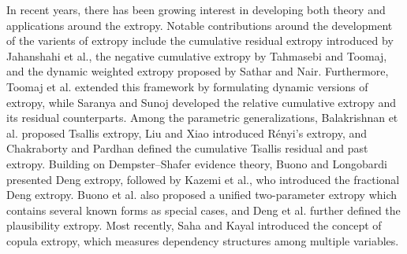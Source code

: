 \documentclass[pdflatex]{sn-jnl}%
\theoremstyle{thmstyleone}
\theoremstyle{thmstyletwo}%
\theoremstyle{thmstylethree}%
\begin{document}
 In recent years, there has been growing interest in developing both theory and applications around the extropy. Notable contributions around the development of the varients of extropy include the cumulative residual extropy introduced by Jahanshahi et al.\cite{jahanshahi2020cumulative}, the negative cumulative extropy by Tahmasebi and Toomaj\cite{tahmasebi2022negative}, and the dynamic weighted extropy proposed by Sathar and Nair\cite{sathar2021dynamic}. Furthermore, Toomaj et al.\cite{toomaj2023extropy} extended this framework by formulating dynamic versions of extropy, while Saranya and Sunoj\cite{saranya2024relative} developed the relative cumulative extropy and its residual counterparts. Among the parametric generalizations, Balakrishnan et al.\cite{balakrishnan2022tsallis} proposed Tsallis extropy, Liu and Xiao\cite{liu2023renyi} introduced Rényi’s extropy, and Chakraborty and Pardhan\cite{chakraborty2023weighted} defined the cumulative Tsallis residual and past extropy. Building on Dempster–Shafer evidence theory, Buono and Longobardi\cite{buono2020dual} presented Deng extropy, followed by Kazemi et al.\cite{kazemi2021fractional}, who introduced the fractional Deng extropy. Buono et al.\cite{buono2024unified} also proposed a unified two-parameter extropy which contains several known forms as special cases, and Deng et al.\cite{deng2024plausibility} further defined the plausibility extropy. Most recently, Saha and Kayal\cite{saha2025copula} introduced the concept of copula extropy, which measures dependency structures among multiple variables.
\end{document}
